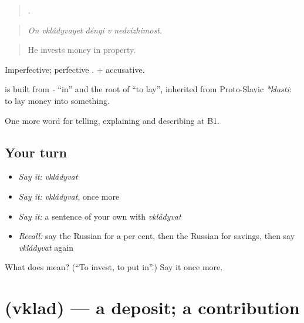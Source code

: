 \begin{quote}
    .
\end{quote}

\begin{quote}
\emph{On vkládyvayet déngi v nedvízhimost.}
\end{quote}

\begin{quote}
He invests money in property.
\end{quote}

Imperfective; perfective \emph{}. \emph{ } + accusative.

\begin{cousinweb}
\textbf{} is built from \emph{-} \textquotedblleft{}in\textquotedblright{} and the root of \emph{} \textquotedblleft{}to lay\textquotedblright{}, inherited from Proto-Slavic \emph{*klasti}: to lay money into something.
\end{cousinweb}

\begin{grammarlens}[title={What you've built}]
One more word for telling, explaining and describing at B1.
\end{grammarlens}

\subsection*{Your turn}
\begin{itemize}
\raggedright
  \item \emph{Say it:} \emph{vkládyvat}
  \item \emph{Say it:} \emph{vkládyvat}, once more
  \item \emph{Say it:} a sentence of your own with \emph{vkládyvat}
  \item \emph{Recall:} say the Russian for a per cent, then the Russian for savings, then say \emph{vkládyvat} again
\end{itemize}

\begin{tcolorbox}[breakable,colback=teal!4,colframe=teal!35!black,title={Before you move on}]
What does  mean? (\textquotedblleft{}To invest, to put in\textquotedblright{}.) Say it once more.
\end{tcolorbox}
\section[\texorpdfstring{\ru{вклад} (vklad)}{вклад (vklad)}]{ (vklad) — a deposit; a contribution}

